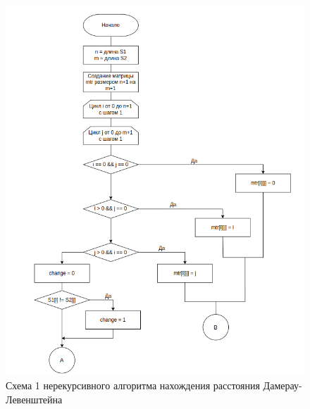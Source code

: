\clearpage

\begin{figure}[h]
	\centering
	\includegraphics[width=\textwidth]{img/dliter1.png}
	\caption{Схема 1 нерекурсивного алгоритма нахождения расстояния Дамерау-Левенштейна}
	\label{fig:DLiter1}
\end{figure}

\clearpage

